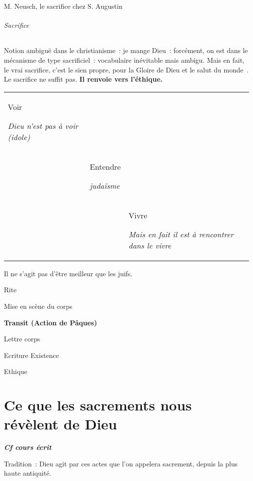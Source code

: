 M. Neusch, le sacrifice chez S. Augustin

\hypertarget{sacrifice}{%
\subparagraph{Sacrifice}\label{sacrifice}}

Notion ambiguë dans le christianisme~: je mange Dieu~: forcément, on est
dans le mécanisme de type sacrificiel~: vocabulaire inévitable mais
ambigu. Mais en fait, le vrai sacrifice, c'est le sien propre, pour la
Gloire de Dieu et le salut du monde~. Le sacrifice ne suffit pas.
\textbf{Il renvoie vers l'éthique.}

\begin{table}[h!]
    \centering
    \sidecaption{  }
 
\begin{tabular}{p{}p{}p{}}
\toprule
Voir

\emph{Dieu n'est pas à voir (idole)} & & \\
& Entendre

\emph{judaïsme} & \\
& & Vivre

\emph{Mais en fait il est à rencontrer dans le vivre} \\
\bottomrule
\end{tabular}
\label{tab:my_label}
\end{table}
 

Il ne s'agit pas d'être meilleur que les juifs.

Rite

Mise en scène du corps

\textbf{Transit (Action de Pâques)}

Lettre corps

Ecriture Existence

Ethique

\chapter{Ce que les sacrements nous révèlent de Dieu}

 



\emph{\textbf{Cf cours écrit}}

Tradition~: Dieu agit par ces actes que l'on appelera sacrement, depuis
la plus haute antiquité.

